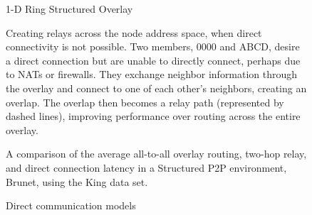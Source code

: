 \begin{figure}[ht]
\centering
\caption{1-D Ring Structured Overlay}
\label{fig:ring_overlay}
\end{figure}

\begin{figure}[ht]
\centering
{}
\caption[Proactive relay creation]{Creating relays across the node address
space, when direct connectivity is not possible.  Two members, 0000 and ABCD, 
desire a direct connection but are unable to directly connect, perhaps due to
NATs or firewalls.  They exchange neighbor information through the overlay and
connect to one of each other's neighbors, creating an overlap.  The overlap
then becomes a relay path (represented by dashed lines), improving performance
over routing across the entire overlay.}
\label{fig:relay}
\end{figure}

\begin{figure}[ht]
\centering
{}
\caption[Relay evaluation]{A comparison of the average all-to-all overlay
routing, two-hop relay, and direct connection latency in a Structured P2P
environment, Brunet, using the King data set.}
\label{fig:simulated_relays}
\end{figure}

\begin{figure}[ht]
\centering
\caption{Direct communication models}
\label{fig:direct_communication}
\end{figure}
